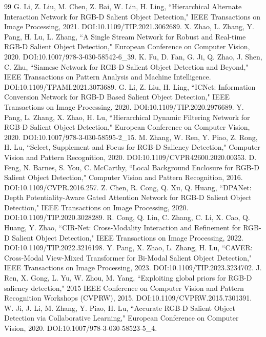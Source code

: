 \documentclass[11pt]{article}
\begin{document}
\begin{thebibliography}{99}
 G. Li, Z. Liu, M. Chen, Z. Bai, W. Lin, H. Ling, ``Hierarchical Alternate Interaction Network for RGB-D Salient Object Detection," IEEE Transactions on Image Processing, 2021. DOI:10.1109/TIP.2021.3062689.
 X. Zhao, L. Zhang, Y. Pang, H. Lu, L. Zhang, ``A Single Stream Network for Robust and Real-time RGB-D Salient Object Detection," European Conference on Computer Vision, 2020. DOI:10.1007/978-3-030-58542-6\_39.
 K. Fu, D. Fan, G. Ji, Q. Zhao, J. Shen, C. Zhu, ``Siamese Network for RGB-D Salient Object Detection and Beyond," IEEE Transactions on Pattern Analysis and Machine Intelligence. DOI:10.1109/TPAMI.2021.3073689.
 G. Li, Z. Liu, H. Ling, ``ICNet: Information Conversion Network for RGB-D Based Salient Object Detection," IEEE Transactions on Image Processing, 2020. DOI:10.1109/TIP.2020.2976689.
 Y. Pang, L. Zhang, X. Zhao, H. Lu, ``Hierarchical Dynamic Filtering Network for RGB-D Salient Object Detection," European Conference on Computer Vision, 2020. DOI:10.1007/978-3-030-58595-2\_15.
 M. Zhang, W. Ren, Y. Piao, Z. Rong, H. Lu, ``Select, Supplement and Focus for RGB-D Saliency Detection," Computer Vision and Pattern Recognition, 2020. DOI:10.1109/CVPR42600.2020.00353.
 D. Feng, N. Barnes, S. You, C. McCarthy, ``Local Background Enclosure for RGB-D Salient Object Detection," Computer Vision and Pattern Recognition, 2016. DOI:10.1109/CVPR.2016.257.
 Z. Chen, R. Cong, Q. Xu, Q. Huang, ``DPANet: Depth Potentiality-Aware Gated Attention Network for RGB-D Salient Object Detection," IEEE Transactions on Image Processing, 2020. DOI:10.1109/TIP.2020.3028289.
 R. Cong, Q. Lin, C. Zhang, C. Li, X. Cao, Q. Huang, Y. Zhao, ``CIR-Net: Cross-Modality Interaction and Refinement for RGB-D Salient Object Detection," IEEE Transactions on Image Processing, 2022. DOI:10.1109/TIP.2022.3216198.
 Y. Pang, X. Zhao, L. Zhang, H. Lu, ``CAVER: Cross-Modal View-Mixed Transformer for Bi-Modal Salient Object Detection," IEEE Transactions on Image Processing, 2023. DOI:10.1109/TIP.2023.3234702.
 J. Ren, X. Gong, L. Yu, W. Zhou, M. Yang, ``Exploiting global priors for RGB-D saliency detection," 2015 IEEE Conference on Computer Vision and Pattern Recognition Workshops (CVPRW), 2015. DOI:10.1109/CVPRW.2015.7301391.
 W. Ji, J. Li, M. Zhang, Y. Piao, H. Lu, ``Accurate RGB-D Salient Object Detection via Collaborative Learning," European Conference on Computer Vision, 2020. DOI:10.1007/978-3-030-58523-5\_4.

\end{thebibliography}
\end{document}
